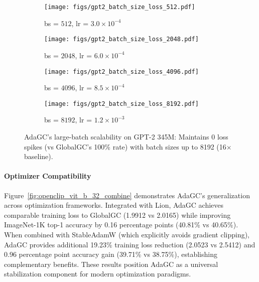 \begin{figure*}[!ht]
    \vskip 0.1in
    \centering
    \begin{subfigure}{0.246\textwidth}
        \centering
        \texttt{[image: figs/gpt2\_batch\_size\_loss\_512.pdf]}
        \caption{bs = $512$, lr = $3.0 \times 10^{-4}$}
        \label{fig:gpt_bs_512}
    \end{subfigure} \hfill
    \begin{subfigure}{0.246\textwidth}
        \centering
        \texttt{[image: figs/gpt2\_batch\_size\_loss\_2048.pdf]}
        \caption{bs = $2048$, lr = $6.0 \times 10^{-4}$}
        \label{fig:gpt_bs_2048}
    \end{subfigure} \hfill
    \begin{subfigure}{0.246\textwidth}
        \centering
        \texttt{[image: figs/gpt2\_batch\_size\_loss\_4096.pdf]}
        \caption{bs = $4096$, lr = $8.5 \times 10^{-4}$}
        \label{fig:gpt_bs_4096}
    \end{subfigure} \hfill
    \begin{subfigure}{0.246\textwidth}
        \centering
        \texttt{[image: figs/gpt2\_batch\_size\_loss\_8192.pdf]}
        \caption{bs = $8192$, lr = $1.2 \times 10^{-3}$}
        \label{fig:gpt_bs_8192}
    \end{subfigure}
    \vspace{-7mm}
    \caption{AdaGC's large-batch scalability on GPT-2 345M: Maintains 0 loss spikes (vs GlobalGC's 100\% rate) with batch sizes up to 8192 (16$\times$ baseline).}
    \label{fig:gpt2_large_bs_and_lr_only_loss}
    \vskip -0.2in
\end{figure*}


\paragraph{Optimizer Compatibility}
Figure~\ref{fig:openclip_vit_b_32_combine} demonstrates AdaGC's generalization across optimization frameworks. Integrated with Lion, AdaGC achieves comparable training loss to GlobalGC (1.9912 vs 2.0165) while improving ImageNet-1K top-1 accuracy by 0.16 percentage points (40.81\% vs 40.65\%). When combined with StableAdamW (which explicitly avoids gradient clipping), AdaGC provides additional 19.23\% training loss reduction (2.0523 vs 2.5412) and 0.96 percentage point accuracy gain (39.71\% vs 38.75\%), establishing complementary benefits. These results position AdaGC as a universal stabilization component for modern optimization paradigms.

